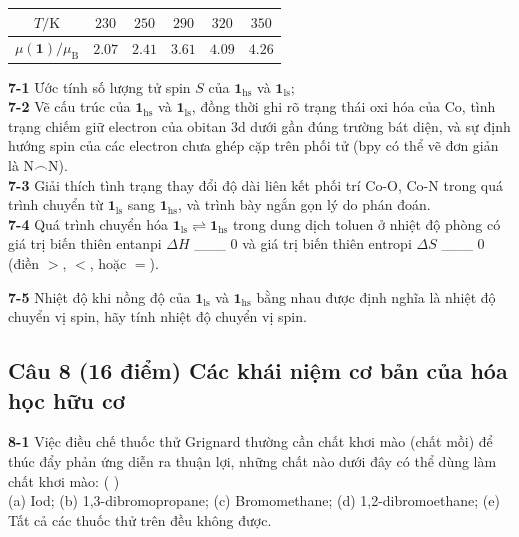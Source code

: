 \begin{center}
\renewcommand{\arraystretch}{1.2}
\begin{tabular}{|c|c|c|c|c|c|}
\hline
$T / \mathrm{K}$ & $230$ & $250$ & $290$ & $320$ & $350$ \\
\hline
$\mu(\mathbf{1}) / \mu_\mathrm{B}$ & $2.07$ & $2.41$ & $3.61$ & $4.09$ & $4.26$ \\
\hline
\end{tabular}
\end{center}

\vspace{0.2cm}

\noindent
\textbf{7-1} Ước tính số lượng tử spin $S$ của $\mathbf{1}_\mathrm{hs}$ và $\mathbf{1}_\mathrm{ls}$; \\
\textbf{7-2} Vẽ cấu trúc của $\mathbf{1}_\mathrm{hs}$ và $\mathbf{1}_\mathrm{ls}$, đồng thời ghi rõ trạng thái oxi hóa của Co, tình trạng chiếm giữ electron của obitan 3d dưới gần đúng trường bát diện, và sự định hướng spin của các electron chưa ghép cặp trên phối tử (bpy có thể vẽ đơn giản là N$\frown$N). \\
\textbf{7-3} Giải thích tình trạng thay đổi độ dài liên kết phối trí Co-O, Co-N trong quá trình chuyển từ $\mathbf{1}_\mathrm{ls}$ sang $\mathbf{1}_\mathrm{hs}$, và trình bày ngắn gọn lý do phán đoán. \\
\textbf{7-4} Quá trình chuyển hóa $\mathbf{1}_\mathrm{ls} \rightleftharpoons \mathbf{1}_\mathrm{hs}$ trong dung dịch toluen ở nhiệt độ phòng có giá trị biến thiên entanpi $\Delta H$ \_\_\_ 0 và giá trị biến thiên entropi $\Delta S$ \_\_\_ 0 (điền $>$, $<$, hoặc $=$).

\noindent
\textbf{7-5} Nhiệt độ khi nồng độ của $\mathbf{1}_\mathrm{ls}$ và $\mathbf{1}_\mathrm{hs}$ bằng nhau được định nghĩa là nhiệt độ chuyển vị spin, hãy tính nhiệt độ chuyển vị spin.

\vspace{0.5cm}

\subsection{Câu 8 (16 điểm) Các khái niệm cơ bản của hóa học hữu cơ}

\noindent
\textbf{8-1} Việc điều chế thuốc thử Grignard thường cần chất khơi mào (chất mồi) để thúc đẩy phản ứng diễn ra thuận lợi, những chất nào dưới đây có thể dùng làm chất khơi mào: ( \hspace{1cm} ) \\
(a) Iod; (b) 1,3-dibromopropane; (c) Bromomethane; (d) 1,2-dibromoethane; (e) Tất cả các thuốc thử trên đều không được.

